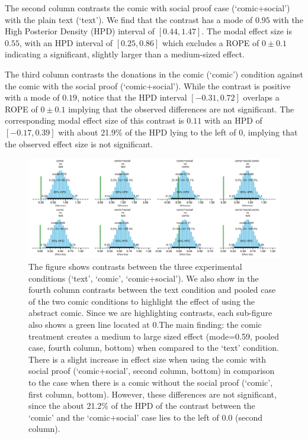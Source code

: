 The second column contrasts the comic with social proof case (`comic+social') with the plain text (`text'). We find that the contrast has a mode of $0.95$ with the High Posterior Density (HPD) interval of $[0.44, 1.47]$. The modal effect size is $0.55$, with an HPD interval of $[0.25, 0.86]$ which excludes a ROPE of $0 \pm 0.1$ indicating a significant, slightly larger than a medium-sized effect.

The third column contrasts the donations in the comic (`comic') condition against the comic with the social proof (`comic+social'). While the contrast is positive with a mode of $0.19$, notice that the HPD interval $[-0.31, 0.72]$ overlaps a ROPE of $0 \pm 0.1$ implying that the observed differences are not significant. The corresponding modal effect size of this contrast is $0.11$ with an HPD of $[-0.17, 0.39]$ with about 21.9\% of the HPD lying to the left of 0, implying that the observed effect size is not significant.


\begin{figure}[htb]
	\includegraphics[width=1\textwidth]{./figures/robust_contrasts.pdf}
    \caption{The figure shows contrasts between the three experimental conditions (`text', `comic', `comic+social'). We also show in the fourth column contrasts between the text condition and pooled case of the two comic conditions to highlight the effect of using the abstract comic. Since we are highlighting contrasts, each sub-figure also shows a green line located at 0.The main finding: the comic treatment creates a medium to large sized effect (mode=0.59, pooled case, fourth column, bottom) when compared to the `text' condition. There is a slight increase in effect size when using the comic with social proof (`comic+social', second column, bottom) in comparison to the case when there is a comic without the social proof (`comic', first column, bottom). However, these differences are not significant, since the about 21.2\% of the HPD of the contrast between the `comic' and the `comic+social' case lies to the left of 0.0 (second column). }
	\label{fig:robustcontrasts}
\end{figure}

